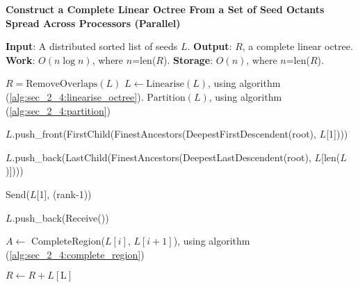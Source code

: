 \begin{algorithm}
    \caption{\textbf{Construct a Complete Linear Octree From a Set of Seed Octants Spread Across Processors (Parallel)}}
    \label{alg:sec_2_4:complete_octree}
    \begin{algorithmic}
        \STATE \textbf{Input}: A distributed sorted list of seeds $L$.
        \STATE \textbf{Output}: $R$, a complete linear octree. 
        \STATE \textbf{Work}: $O(n \log n)$, where $n$=len($R$).
        \STATE \textbf{Storage}: $O(n)$, where $n$=len($R$).

        \STATE $R = \text{RemoveOverlaps}(L)$
        \STATE $L \gets \text{Linearise}(L)$, using algorithm (\ref{alg:sec_2_4:linearise_octree}).
        \STATE $\text{Partition}(L)$, using algorithm (\ref{alg:sec_2_4:partition}) 

            \STATE $L$.push\_front(FirstChild(FinestAncestors(DeepestFirstDescendent(root), $L$[1])))
        \ENDIF
        
            \STATE $L$.push\_back(LastChild(FinestAncestors(DeepestLastDescendent(root), $L$[len($L$)])))
        \ENDIF

            \STATE Send($L$[1], (rank-1))
        \ENDIF

            \STATE $L$.push\_back(Receive())
        \ENDIF

            \STATE $A \gets$ CompleteRegion($L[i]$, $L[i+1]$), using algorithm (\ref{alg:sec_2_4:complete_region})
        \ENDFOR
        
            \STATE $R \gets R+L[\text{L}]$
        \ENDIF

    \end{algorithmic}
\end{algorithm}

